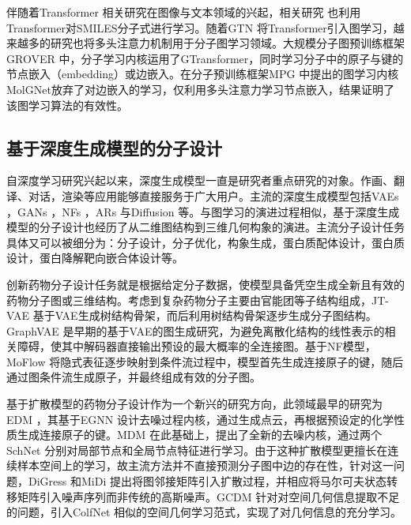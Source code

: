 伴随着Transformer \cite{transformer_vaswani_17}相关研究在图像与文本领域的兴起，相关研究 \cite{smilestrans_honda_19,smilesbert_wang_19,chemberta_chithrananda_20}也利用Transformer对SMILES分子式进行学习。随着GTN \cite{gtn_yun_19}将Transformer引入图学习，越来越多的研究也将多头注意力机制用于分子图学习领域。大规模分子图预训练框架GROVER \cite{grover_rong_20}中，分子学习内核运用了GTransformer，同时学习分子中的原子与键的节点嵌入（embedding）或边嵌入。在分子预训练框架MPG \cite{mpg_li_21}中提出的图学习内核MolGNet放弃了对边嵌入的学习，仅利用多头注意力学习节点嵌入，结果证明了该图学习算法的有效性。

\subsection{基于深度生成模型的分子设计}
自深度学习研究兴起以来，深度生成模型一直是研究者重点研究的对象。作画、翻译、对话，渲染等应用能够直接服务于广大用户。主流的深度生成模型包括VAEs \cite{vae_kingma_13}，GANs \cite{gan_goodfellow_14}，NFs \cite{nice_dinh_15,density_dinh_17}，ARs \cite{ar_oord_16}与Diffusion \cite{deepunsupervised_dickstein_15,generative_song_19}等。与图学习的演进过程相似，基于深度生成模型的分子设计也经历了从二维图结构到三维几何构象的演进。主流分子设计任务具体又可以被细分为：分子设计，分子优化，构象生成，蛋白质配体设计，蛋白质设计，蛋白降解靶向嵌合体设计等。

创新药物分子设计任务就是根据给定分子数据，使模型具备凭空生成全新且有效的药物分子图或三维结构。考虑到复杂药物分子主要由官能团等子结构组成，JT-VAE \cite{jtvae_jin_18}基于VAE生成树结构骨架，而后利用树结构骨架逐步生成分子图结构。GraphVAE \cite{graphvae_simonovsky_18}是早期的基于VAE的图生成研究，为避免离散化结构的线性表示的相关障碍，使其中解码器直接输出预设的最大概率的全连接图。基于NF模型，MoFlow \cite{moflow_zang_20}将隐式表征逐步映射到条件流过程中，模型首先生成连接原子的键，随后通过图条件流生成原子，并最终组成有效的分子图。

基于扩散模型的药物分子设计作为一个新兴的研究方向，此领域最早的研究为EDM \cite{edm_hoogeboom_22}，其基于EGNN \cite{egnn_satorras_21}设计去噪过程内核，通过生成点云，再根据预设定的化学性质生成连接原子的键。MDM \cite{mdm_huang_23}在此基础上，提出了全新的去噪内核，通过两个SchNet \cite{schnet_schutt_17}分别对局部节点和全局节点特征进行学习。由于这种扩散模型更擅长在连续样本空间上的学习，故主流方法并不直接预测分子图中边的存在性，针对这一问题，DiGress \cite{digress_vignac_22}和MiDi \cite{midi_vignac_23}提出将图邻接矩阵引入扩散过程，并相应将马尔可夫状态转移矩阵引入噪声序列而非传统的高斯噪声。GCDM \cite{gcdm_morehead_23}针对对空间几何信息提取不足的问题，引入ColfNet \cite{colfnet_du_22}相似的空间几何学习范式，实现了对几何信息的充分学习。

